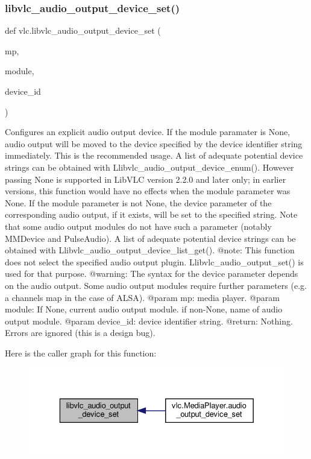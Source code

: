 \subsubsection{\texorpdfstring{libvlc\+\_\+audio\+\_\+output\+\_\+device\+\_\+set()}{libvlc\_audio\_output\_device\_set()}}
{\footnotesize\ttfamily def vlc.\+libvlc\+\_\+audio\+\_\+output\+\_\+device\+\_\+set (\begin{DoxyParamCaption}\item[{}]{mp,  }\item[{}]{module,  }\item[{}]{device\+\_\+id }\end{DoxyParamCaption})}

\begin{DoxyVerb}Configures an explicit audio output device.
If the module paramater is None, audio output will be moved to the device
specified by the device identifier string immediately. This is the
recommended usage.
A list of adequate potential device strings can be obtained with
L{libvlc_audio_output_device_enum}().
However passing None is supported in LibVLC version 2.2.0 and later only;
in earlier versions, this function would have no effects when the module
parameter was None.
If the module parameter is not None, the device parameter of the
corresponding audio output, if it exists, will be set to the specified
string. Note that some audio output modules do not have such a parameter
(notably MMDevice and PulseAudio).
A list of adequate potential device strings can be obtained with
L{libvlc_audio_output_device_list_get}().
@note: This function does not select the specified audio output plugin.
L{libvlc_audio_output_set}() is used for that purpose.
@warning: The syntax for the device parameter depends on the audio output.
Some audio output modules require further parameters (e.g. a channels map
in the case of ALSA).
@param mp: media player.
@param module: If None, current audio output module. if non-None, name of audio output module.
@param device_id: device identifier string.
@return: Nothing. Errors are ignored (this is a design bug).
\end{DoxyVerb}
 Here is the caller graph for this function\+:
\nopagebreak
\begin{figure}[H]
\begin{center}
\leavevmode
\includegraphics[width=329pt]{namespacevlc_a25b3f026d49515a2d0ae0906495c5fcb_icgraph}
\end{center}
\end{figure}
\mbox{\label{namespacevlc_a8261ae46b9414ab68671c6c9d2799d47}} 
